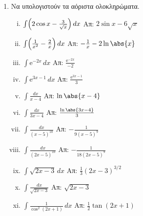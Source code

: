 \documentclass[a4paper,table]{report}
\begin{document}
\begin{center}
  \minibox{{\large\bfseries \textcolor{Col1}{Ασκήσεις στα Αόριστα Ολοκληρώματα}}}
\end{center}

\vspace{\baselineskip}


\begin{enumerate}
  \item Να υπολογιστούν τα αόριστα ολοκληρώματα.
    \begin{enumerate}[i)]
      \item $\int \Bigl(2 \cos{x} - \frac{3}{\sqrt{x}}\Bigr) \, dx $ 
        \hfill Απ: $ 2 \sin{x} - 6 \sqrt{x} $  
      \item $\int \Bigl(\frac{1}{x^{2}} - \frac{2}{x}\Bigr) \, dx  $ 
        \hfill Απ: $ - \frac{1}{x} - 2 \ln{\abs{x}} $
      \item $\int \mathrm{e}^{-2x} \, dx $ \hfill Απ: $ \frac{\mathrm{e}^{-2x}}{-2} $
      \item $\int \mathrm{e}^{3x-1} \, dx $ \hfill Απ: $ \frac{\mathrm{e}^{3x-1}}{3} $
      \item $\int\frac{dx}{x-4} $ \hfill Απ: $ \ln{\abs{x-4}}$
      \item $\int\frac{dx}{3x-4} $ \hfill Απ: $ \frac{\ln{\abs{3x-4}}}{3} $
      \item $\int\frac{dx}{(x-5)^{10}} $ \hfill Απ: $-\frac{1}{9(x-5)^9}$
      \item $\int\frac{dx}{(2x-5)^{10}} $ \hfill Απ: $-\frac{1}{18(2x-5)^9}$
      \item $ \int \sqrt{2x-3} \, dx $ \hfill Απ: $ \frac{1}{3} (2x-3)^{3/2} $
      \item $ \int\frac{dx}{\sqrt{2x-3}}$ \hfill Απ: $ \sqrt{2x-3} $
      \item $ \int \frac{1}{\cos^{2}{(2x+1)}} \,{dx} $ 
        \hfill Απ: $ \frac{1}{2} \tan{(2x+1)} $ 
    \end{enumerate}

\end{enumerate}
\end{document}
